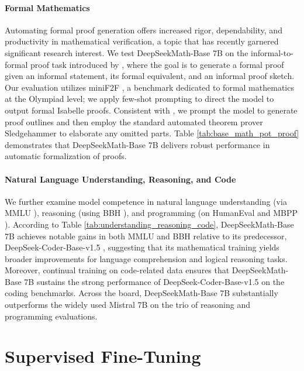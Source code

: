 \paragraph{Formal Mathematics}

Automating formal proof generation offers increased rigor, dependability, and productivity in mathematical verification, a topic that has recently garnered significant research interest. We test DeepSeekMath-Base 7B on the informal-to-formal proof task introduced by \citep{dsp_proof}, where the goal is to generate a formal proof given an informal statement, its formal equivalent, and an informal proof sketch. Our evaluation utilizes miniF2F \citep{minif2f}, a benchmark dedicated to formal mathematics at the Olympiad level; we apply few-shot prompting to direct the model to output formal Isabelle proofs. Consistent with \cite{dsp_proof}, we prompt the model to generate proof outlines and then employ the standard automated theorem prover Sledgehammer \citep{sledgehammer} to elaborate any omitted parts. Table \ref{tab:base_math_pot_proof} demonstrates that DeepSeekMath-Base 7B delivers robust performance in automatic formalization of proofs.

\paragraph{Natural Language Understanding, Reasoning, and Code}

We further examine model competence in natural language understanding (via MMLU \citep{mmlu}), reasoning (using BBH \citep{bbh}), and programming (on HumanEval \citep{codex} and MBPP \citep{mbpp}). According to Table \ref{tab:understanding_reasoning_code}, DeepSeekMath-Base 7B achieves notable gains in both MMLU and BBH relative to its predecessor, DeepSeek-Coder-Base-v1.5 \citep{deepseek-coder}, suggesting that its mathematical training yields broader improvements for language comprehension and logical reasoning tasks. Moreover, continual training on code-related data ensures that DeepSeekMath-Base 7B sustains the strong performance of DeepSeek-Coder-Base-v1.5 on the coding benchmarks. Across the board, DeepSeekMath-Base 7B substantially outperforms the widely used Mistral 7B \citep{mistral} on the trio of reasoning and programming evaluations.

\section{Supervised Fine-Tuning}


